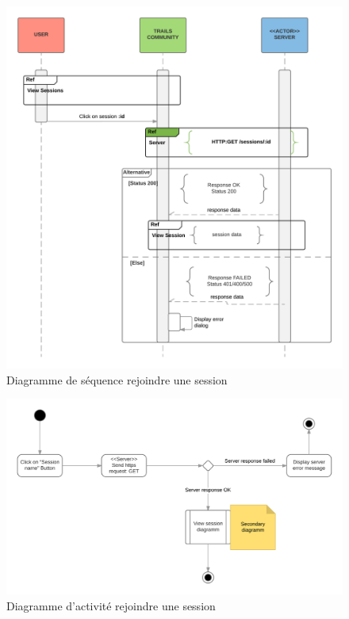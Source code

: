 \documentclass[titlepage, 12pt]{report}
\begin{document}
\begin{figure}[!h]
	\caption{Diagramme de séquence rejoindre une session}
	\label{join_session_sequence_diagram}
	\centering
	\includegraphics[scale=0.7]{Images/diagram/selection_session_sequence_diagram.png}
\end{figure}

\clearpage


\begin{figure}[!h]
	\caption{Diagramme d'activité rejoindre une session}
	\label{join_session_activity_diagram}
	\centering
	\includegraphics[scale=0.7]{Images/diagram/selection_session_activity_diagram.png}
\end{figure}
\end{document}
